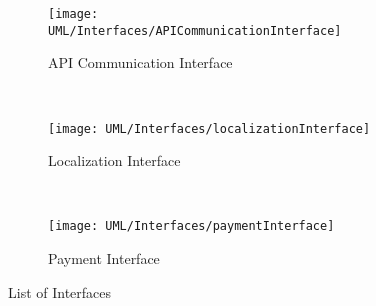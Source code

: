 \begin{figure}[H]\ContinuedFloat
	\begin{subfigure}[t]{0.3\linewidth}
		\centering
		\texttt{[image: UML/Interfaces/APICommunicationInterface]}
		\caption{API Communication Interface}
	\end{subfigure}
	~
	\begin{subfigure}[t]{0.3\linewidth}
		\centering
		\texttt{[image: UML/Interfaces/localizationInterface]}
		\caption{Localization Interface}
	\end{subfigure}
	~
	\begin{subfigure}[t]{0.3\linewidth}
		\centering
		\texttt{[image: UML/Interfaces/paymentInterface]}
		\caption{Payment Interface}
	\end{subfigure}
	
	\caption{List of Interfaces}
\end{figure}